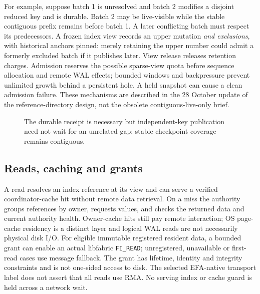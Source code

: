\documentclass[11pt,a4paper]{article}
\begin{document}
For example, suppose batch 1 is unresolved and batch 2 modifies a disjoint reduced key and is durable. Batch 2 may be live-visible while the stable contiguous prefix remains before batch 1. A later conflicting batch must respect its predecessors. A frozen index view records an upper mutation \emph{and exclusions}, with historical anchors pinned: merely retaining the upper number could admit a formerly excluded batch if it publishes later. View release releases retention charges. Admission reserves the possible sparse-view quota before sequence allocation and remote WAL effects; bounded windows and backpressure prevent unlimited growth behind a persistent hole. A held snapshot can cause a clean admission failure. These mechanisms are described in the 28 October update of the reference-directory design, not the obsolete contiguous-live-only brief.

\begin{figure}[htbp]\centering
{}
\caption{The durable receipt is necessary but independent-key publication need not wait for an unrelated gap; stable checkpoint coverage remains contiguous.}\label{fig:write}
\end{figure}

\subsection{Reads, caching and grants}\label{sec:reads}
A read resolves an index reference at its view and can serve a verified coordinator-cache hit without remote data retrieval. On a miss the authority groups references by owner, requests values, and checks the returned data and current authority health. Owner-cache hits still pay remote interaction; OS page-cache residency is a distinct layer and logical WAL reads are not necessarily physical disk I/O. For eligible immutable registered resident data, a bounded grant can enable an actual libfabric \texttt{FI\_READ}; unregistered, unavailable or first-read cases use message fallback. The grant has lifetime, identity and integrity constraints and is not one-sided access to disk. The selected EFA-native transport label does not assert that all reads use RMA. No serving index or cache guard is held across a network wait.
\end{document}
